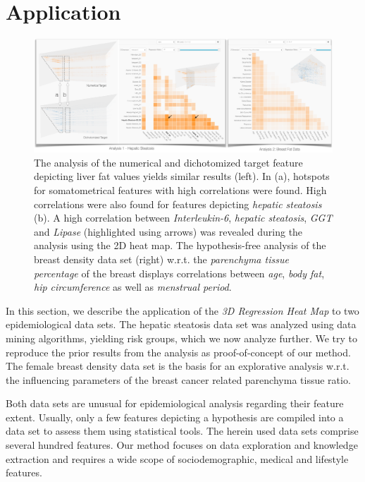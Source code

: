 \documentclass[journal]{style/vgtc} 			          %
\begin{document}
\section{Application} \label{application}
\begin{figure}[htb]
 \centering
 \includegraphics[width=1.0\linewidth]{figures/application}
 \caption{
 The analysis of the numerical and dichotomized target feature depicting liver fat values yields similar results (left).
 In (a), hotspots for somatometrical features with high correlations were found.
 High correlations were also found for features depicting \emph{hepatic steatosis} (b).
 A high correlation between \emph{Interleukin-6}, \emph{hepatic steatosis}, \emph{GGT} and \emph{Lipase} (highlighted using arrows) was revealed during the analysis using the 2D heat map.
 The hypothesis-free analysis of the breast density data set (right) w.r.t. the \emph{parenchyma tissue percentage} of the breast displays correlations between \emph{age}, \emph{body fat}, \emph{hip circumference} as well as \emph{menstrual period}.
 }
  \label{fig:Application}
\end{figure}
In this section, we describe the application of the \emph{3D Regression Heat Map} to two epidemiological data sets.
The hepatic steatosis data set was analyzed using data mining algorithms, yielding risk groups, which we now analyze further.
We try to reproduce the prior results from the analysis as proof-of-concept of our method.
The female breast density data set is the basis for an explorative analysis w.r.t. the influencing parameters of the breast cancer related parenchyma tissue ratio.

Both data sets are unusual for epidemiological analysis regarding their feature extent.
Usually, only a few features depicting a hypothesis are compiled into a data set to assess them using statistical tools.
The herein used data sets comprise several hundred features.
Our method focuses on data exploration and knowledge extraction and requires a wide scope of sociodemographic, medical and lifestyle features.
\end{document}

